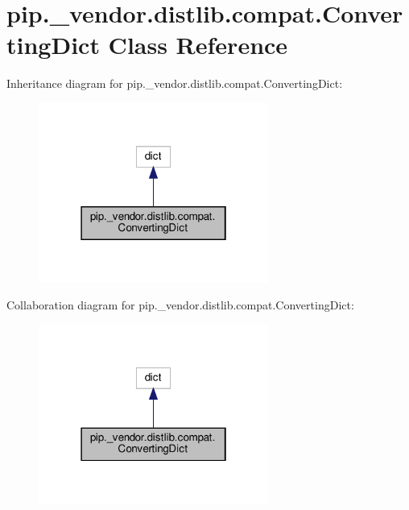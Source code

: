\hypertarget{classpip_1_1__vendor_1_1distlib_1_1compat_1_1ConvertingDict}{}\section{pip.\+\_\+vendor.\+distlib.\+compat.\+Converting\+Dict Class Reference}
\label{classpip_1_1__vendor_1_1distlib_1_1compat_1_1ConvertingDict}


Inheritance diagram for pip.\+\_\+vendor.\+distlib.\+compat.\+Converting\+Dict\+:
\nopagebreak
\begin{figure}[H]
\begin{center}
\leavevmode
\includegraphics[width=214pt]{classpip_1_1__vendor_1_1distlib_1_1compat_1_1ConvertingDict__inherit__graph}
\end{center}
\end{figure}


Collaboration diagram for pip.\+\_\+vendor.\+distlib.\+compat.\+Converting\+Dict\+:
\nopagebreak
\begin{figure}[H]
\begin{center}
\leavevmode
\includegraphics[width=214pt]{classpip_1_1__vendor_1_1distlib_1_1compat_1_1ConvertingDict__coll__graph}
\end{center}
\end{figure}
